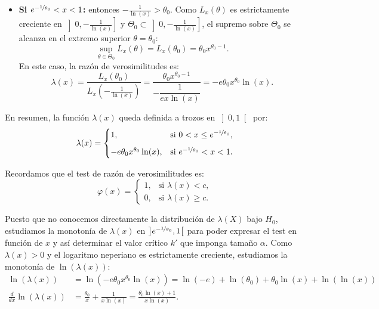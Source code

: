\begin{ejercicio}
\begin{itemize}
        \item \textbf{Si $e^{-\nicefrac{1}{\theta_0}} < x < 1$:} entonces $-\frac{1}{\ln(x)} > \theta_0$. Como $L_x(\theta)$ es estrictamente creciente en $\left]0, -\frac{1}{\ln(x)}\right]$ y $\Theta_0 \subset \left]0, -\frac{1}{\ln(x)}\right]$, el supremo sobre $\Theta_0$ se alcanza en el extremo superior $\theta = \theta_0$:
        \begin{equation*}
            \sup\limits_{\theta \in \Theta_0} L_x(\theta) = L_x(\theta_0) = \theta_0 x^{\theta_0 - 1}.
        \end{equation*}
        En este caso, la razón de verosimilitudes es:
        \begin{equation*}
            \lambda(x) = \frac{L_x(\theta_0)}{L_x\left(-\frac{1}{\ln(x)}\right)} = \frac{\theta_0 x^{\theta_0 - 1}}{-\dfrac{1}{e x \ln(x)}} = -e \theta_0 x^{\theta_0} \ln(x).
        \end{equation*}
    \end{itemize}

    En resumen, la función $\lambda(x)$ queda definida a trozos en $\left]0, 1\right[$ por:
    \begin{equation*}
        \lambda(x) =
        \begin{cases}
            1, & \text{si } 0 < x \leq e^{-\nicefrac{1}{\theta_0}}, \\[6pt]
            -e \theta_0 x^{\theta_0} \ln(x), & \text{si } e^{-\nicefrac{1}{\theta_0}} < x < 1.
        \end{cases}
    \end{equation*}

    Recordamos que el test de razón de verosimilitudes es:
    \begin{equation*}
        \varphi(x) =
        \begin{cases}
            1, & \text{si } \lambda(x) < c, \\[2pt]
            0, & \text{si } \lambda(x) \geq c.
        \end{cases}
    \end{equation*}

    Puesto que no conocemos directamente la distribución de $\lambda(X)$ bajo $H_0$, estudiamos la monotonía de $\lambda(x)$ en $\left]e^{-\nicefrac{1}{\theta_0}}, 1\right[$ para poder expresar el test en función de $x$ y así determinar el valor crítico $k'$ que imponga tamaño $\alpha$. Como $\lambda(x)>0$ y el logaritmo neperiano es estrictamente creciente, estudiamos la monotonía de $\ln(\lambda(x))$:
    \begin{align*}
        \ln(\lambda(x)) &= \ln(-e \theta_0 x^{\theta_0} \ln(x)) = \ln(-e) + \ln(\theta_0) + \theta_0 \ln(x) + \ln(\ln(x))\\
        \frac{d}{dx} \ln(\lambda(x)) &= \frac{\theta_0}{x} + \frac{1}{x \ln(x)} = \frac{\theta_0 \ln(x) + 1}{x \ln(x)}.
    \end{align*}
    

\end{ejercicio}
